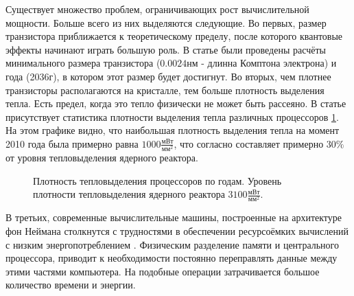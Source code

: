 Существует множество проблем, ограничивающих рост вычислительной мощности. Больше всего из них выделяются следующие. Во первых, размер транзистора приближается к теоретическому пределу, после которого квантовые эффекты начинают играть большую роль. В статье \cite{powell2008quantum} были проведены расчёты минимального размера транзистора ($0.0024$нм - длинна Комптона электрона) и года (2036г), в котором этот размер будет достигнут. Во вторых, чем плотнее транзисторы располагаются на кристалле, тем больше плотность выделения тепла. Есть предел, когда это тепло физически не может быть рассеяно. В статье \cite{danowitz2014exploring} присутствует статистика плотности выделения тепла различных процессоров \ref{ris:WattD}. На этом графике видно, что наибольшая плотность выделения тепла на момент 2010 года была примерно равна $1000\frac{\text{мВт}}{\text{мм}^2}$, что согласно \cite{khan2021advancements} составляет примерно $30\%$ от уровня тепловыделения ядерного реактора.
\begin{figure}[h!]
	\caption{Плотность тепловыделения процессоров по годам. Уровень плотности тепловыделения ядерного реактора $3100\frac{\text{мВт}}{\text{мм}^2}$.}
	\label{ris:WattD}
\end{figure}
В третьих, современные вычислительные машины, построенные на архитектуре фон Неймана столкнутся с трудностями в обеспечении ресурсоёмких вычислений с низким энергопотреблением \cite{indiveri2015memory}. Физическим разделение памяти и центрального процессора, приводит к необходимости постоянно переправлять данные между этими частями компьютера. На подобные операции затрачивается большое количество времени и энергии.
